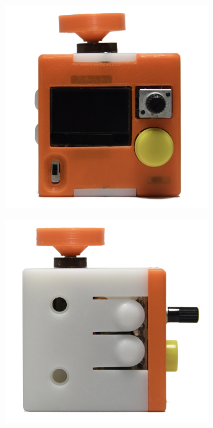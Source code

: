 \begin{figure}[H]
\begin{subfigure}[b]{0.25\textwidth}
        \includegraphics[width=\linewidth]{overleaf/images/sm_front.jpg}
    \end{subfigure}
    \begin{subfigure}[b]{0.25\textwidth}
        \includegraphics[width=\linewidth]{overleaf/images/sm_left.jpg}

\end{subfigure}
\end{figure}

